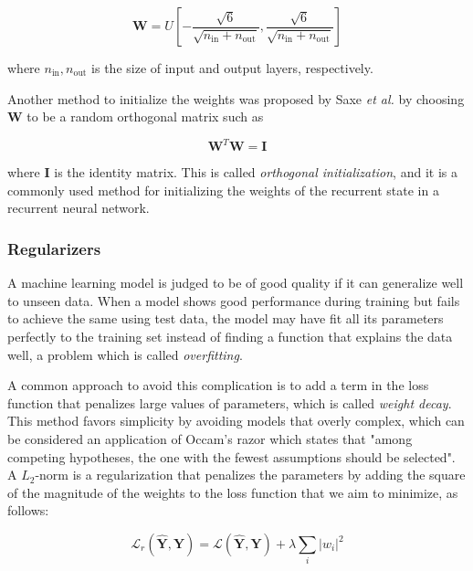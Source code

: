 \documentclass{kththesis}
\begin{document}
\begin{equation}
\mathbf{W} = \mathit{U}[-\frac{\sqrt{6}}{\sqrt{n_\text{in}+n_\text{out}}}, \frac{\sqrt{6}}{\sqrt{n_\text{in}+n_\text{out}}}] 
\end{equation}

where $n_\text{in}, n_\text{out}$ is the size of input and output layers, respectively. 

Another method to initialize the weights was proposed by Saxe \emph{et al.}\citep{saxe2013exact} by choosing $\mathbf{W}$ to be a random orthogonal matrix such as 

\begin{equation}
\mathbf{W}^T\mathbf{W} = \mathbf{I}
\end{equation}

where $\mathbf{I}$ is the identity matrix. This is called \emph{orthogonal initialization}, and it is a commonly used method for initializing the weights of the recurrent state in a recurrent neural network.

\subsubsection{Regularizers}

A machine learning model is judged to be of good quality if it can generalize well to unseen data. When a model shows good performance during training but fails to achieve the same using test data, the model may have fit all its parameters perfectly to the training set instead of finding a function that explains the data well, a problem which is called \emph{overfitting}. 

A common approach to avoid this complication is to add a term in the loss function that penalizes large values of parameters, which is called \emph{weight decay}. This method favors simplicity by avoiding models that overly complex, which can be considered an application of Occam's razor which states that "among competing hypotheses, the one with the fewest assumptions should be selected". A $L_2$-norm is a regularization that penalizes the parameters by adding the square of the magnitude of the weights to the loss function that we aim to minimize\citep{phaisangittisagul2016analysis}, as follows:

\begin{equation}
\mathcal{L}_r(\hat{\mathbf{Y}}, \mathbf{Y}) = \mathcal{L}(\hat{\mathbf{Y}}, \mathbf{Y}) + \lambda \sum_i |w_i|^2
\end{equation}
 
\end{document}
